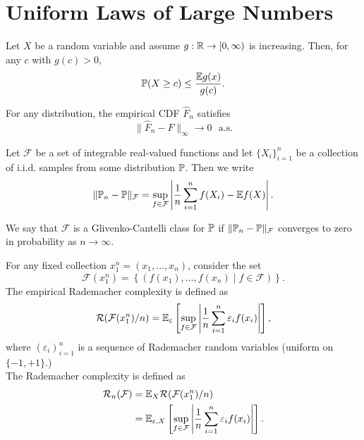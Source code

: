 \section{Uniform Laws of Large Numbers}

\begin{boxtheorem}
    Let $X$ be a random variable and assume
    $g:\R\to[0,\infty)$ is increasing. Then,
    for any $c$ with $g(c)>0$, 
    $$
    \P(X\geq c)\leq\frac{\E g(x)}{g(c)}.
    $$
\end{boxtheorem}

\begin{boxtheorem}
    For any distribution, the empirical CDF $\hat {F}_n$
    satisfies
    $$
    \|\hat F_n-F\|_\infty\to0 \ \ \ \text{a.s.}
    $$
\end{boxtheorem}

\begin{boxdefinition}[]
    Let $\mathcal{F}$ be a set of integrable real-valued
    functions and let $\{X_i\}_{i=1}^n$ be a collection 
    of i.i.d. samples from some distribution $\P$. Then
    we write 
    $$
    \|\P_n-\P\|_\mathcal{F}=\sup_{f\in\mathcal{F}}
    \left|\frac{1}{n}\sum_{i=1}^n f(X_i)-\E f(X)\right|.
    $$
\end{boxdefinition}

\begin{boxdefinition}
    We say that $\mathcal{F}$ is a Glivenko-Cantelli 
    class for $\P$ if $\|\P_n-\P\|_\mathcal{F}$ converges
    to zero in probability as $n\to\infty$.
\end{boxdefinition}

\begin{boxdefinition}
    For any fixed collection 
    $x_1^n=(x_1,\dots,x_n)$, consider the set
    $$
    \mathcal{F}(x_1^n)= 
    \left\lbrace(f(x_1),\dots,f(x_n)
    \mid f\in \mathcal{F})\right\rbrace.
    $$
    The empirical Rademacher complexity is defined as 
    $$
    \mathcal{R}(\mathcal{F}(x_1^n)/n)=
    \E_\varepsilon\left[\sup_{f\in\mathcal{F}}
    \left|\frac{1}{n}\sum_{i=1}^n\varepsilon_i
    f(x_i)\right|\right],
    $$
    where $(\varepsilon_i)_{i=1}^n$ is a sequence 
    of Rademacher random variables (uniform on
    $\{-1,+1\}$.)\\
    The Rademacher complexity is defined as
    \begin{align}
        \mathcal{R}_n(\mathcal{F})&=\E_X
        \mathcal{R}(\mathcal{F}(x_1^n)/n)\\
        &=\E_{\varepsilon,X}\left[\sup_{f\in\mathcal{F}}
    \left|\frac{1}{n}\sum_{i=1}^n\varepsilon_i
    f(x_i)\right|\right].
    \end{align}
\end{boxdefinition}

